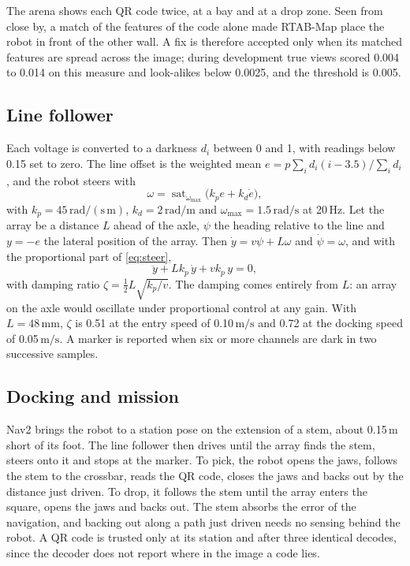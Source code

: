 \documentclass[conference,a4paper]{IEEEtran}
\newcommand{\unit}[1]{\ensuremath{\,\mathrm{#1}}}
\begin{document}
The arena shows each QR code twice, at a bay and at a drop zone. Seen from close by, a
match of the features of the code alone made RTAB-Map place the robot in front of the other
wall. A fix is therefore accepted only when its matched features are spread across the
image; during development true views scored 0.004 to 0.014 on this measure and look-alikes
below 0.0025, and the threshold is 0.005.

\subsection{Line follower}
Each voltage is converted to a darkness $d_i$ between 0 and 1, with readings below 0.15 set
to zero. The line offset is the weighted mean $e=p\sum_i d_i(i-3.5)/\sum_i d_i$, and the
robot steers with
\begin{equation}
  \omega = \operatorname{sat}_{\omega_{\max}}\bigl(k_p e + k_d\dot e\bigr),
  \label{eq:steer}
\end{equation}
with $k_p=45\unit{rad/(s\,m)}$, $k_d=2\unit{rad/m}$ and $\omega_{\max}=1.5\unit{rad/s}$ at
20\unit{Hz}. Let the array be a distance $L$ ahead of the axle, $\psi$ the heading relative
to the line and $y=-e$ the lateral position of the array. Then $\dot y=v\psi+L\omega$ and
$\dot\psi=\omega$, and with the proportional part of \eqref{eq:steer},
\begin{equation}
  \ddot y + Lk_p\,\dot y + vk_p\,y = 0 ,
\end{equation}
with damping ratio $\zeta=\tfrac12 L\sqrt{k_p/v}$. The damping comes entirely from $L$: an
array on the axle would oscillate under proportional control at any gain. With
$L=48\unit{mm}$, $\zeta$ is 0.51 at the entry speed of 0.10\unit{m/s} and 0.72 at the
docking speed of 0.05\unit{m/s}. A marker is reported when six or more channels are dark in
two successive samples.

\subsection{Docking and mission}
Nav2 brings the robot to a station pose on the extension of a stem, about 0.15\unit{m}
short of its foot. The line follower then drives until the array finds the stem, steers
onto it and stops at the marker. To pick, the robot opens the jaws, follows the stem to the
crossbar, reads the QR code, closes the jaws and backs out by the distance just driven. To
drop, it follows the stem until the array enters the square, opens the jaws and backs out.
The stem absorbs the error of the navigation, and backing out along a path just driven
needs no sensing behind the robot. A QR code is trusted only at its station and after three
identical decodes, since the decoder does not report where in the image a code lies.
\end{document}
